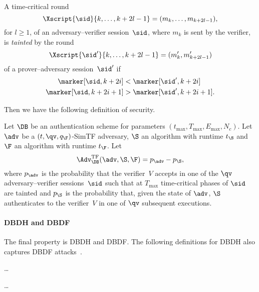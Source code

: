 \begin{definition}\label{TaintedTF}
  A time-critical round
  \[\Xscript{\sid}{k, \dotsc, k+2l-1} = (m_k, \dotsc, m_{k+2l-1}),\] for 
  \(l\geq 1\), of an adversary--verifier session~\(\sid\), where \(m_k\) is 
  sent by the verifier, is \emph{tainted} by the round
  \[\Xscript{\sid'}{k, \dotsc, k+2l-1} = (m'_{k}, m'_{k+2l-1})\]
  of a prover--adversary session~\(\sid'\) if
  \begin{align*}
    \marker[\sid, k+2i] &< \marker[\sid', k+2i] \\
    \marker[\sid, k+2i+1] &> \marker[\sid', k+2i+1].
  \end{align*}
\end{definition}

Then we have the following definition of security.

\begin{definition}%
  \label{TFresistance}
  Let \(\DB\) be an authentication scheme for parameters \((t_{\max}, T_{\max}, 
    E_{\max}, N_c)\).
  Let \(\adv\) be a \((t, \qv, q_{\F})\)-SimTF adversary, \(\S\) an algorithm 
  with runtime \(t_{\S}\) and \(\F\) an algorithm with runtime \(t_{\F}\).
  Let \[
    \Adv_{\DB}^{\text{TF}}(\adv, \S, \F) = p_{\adv} - p_{\S},
  \] where \(p_{\adv}\) is the probability that the verifier~\(V\) accepts in 
  one of the \(\qv\) adversary--verifier sessions~\(\sid\) such that at 
  \(T_{\max}\) time-critical phases of \(\sid\) are tainted and \(p_{\S}\) is 
  the probability that, given the state of \(\adv\), \(\S\) authenticates to 
  the verifier~\(V\) in one of \(\qv\) subsequent executions.
\end{definition}

\paragraph*{\Acl*{DBDH} and \acl*{DBDF}}

The final property is \ac{DBDH} and \ac{DBDF}.
The following definitions for \ac{DBDH} also captures \ac{DBDF} 
attacks~\cite{TREAD}.

\begin{definition}%
  \label{TaintedDH}
  \dots
\end{definition}

\begin{definition}%
  \label{DHresistance}
  \dots
\end{definition}

